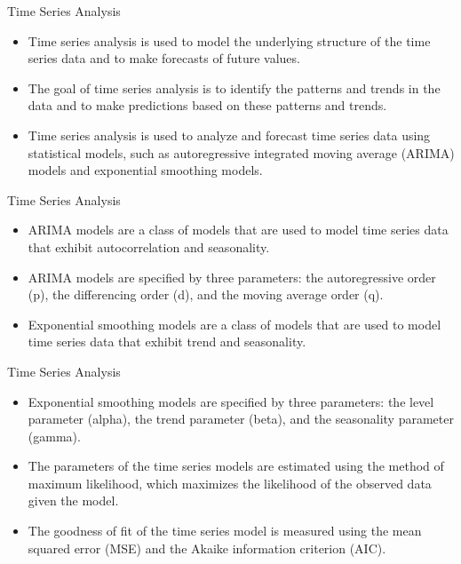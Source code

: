 \documentclass[serif, 9pt, aspectratio=32]{beamer}
\begin{document}
\begin{frame}{Time Series Analysis}
    \begin{itemize}
        \setlength{\itemsep}{2em}
        \item Time series analysis is used to model the underlying structure of the time series data and to make forecasts of future values.
        \item The goal of time series analysis is to identify the patterns and trends in the data and to make predictions based on these patterns and trends.
        \item Time series analysis is used to analyze and forecast time series data using statistical models, such as autoregressive integrated moving average (ARIMA) models and exponential smoothing models.
    \end{itemize}
\end{frame}

\begin{frame}{Time Series Analysis}
    \begin{itemize}
        \setlength{\itemsep}{2em}
        \item ARIMA models are a class of models that are used to model time series data that exhibit autocorrelation and seasonality.
        \item ARIMA models are specified by three parameters: the autoregressive order (p), the differencing order (d), and the moving average order (q).
        \item Exponential smoothing models are a class of models that are used to model time series data that exhibit trend and seasonality.
    \end{itemize}
\end{frame}

\begin{frame}{Time Series Analysis}
    \begin{itemize}
        \setlength{\itemsep}{2em}
        \item Exponential smoothing models are specified by three parameters: the level parameter (alpha), the trend parameter (beta), and the seasonality parameter (gamma).
        \item The parameters of the time series models are estimated using the method of maximum likelihood, which maximizes the likelihood of the observed data given the model.
        \item The goodness of fit of the time series model is measured using the mean squared error (MSE) and the Akaike information criterion (AIC).
    \end{itemize}
\end{frame}
\end{document}
